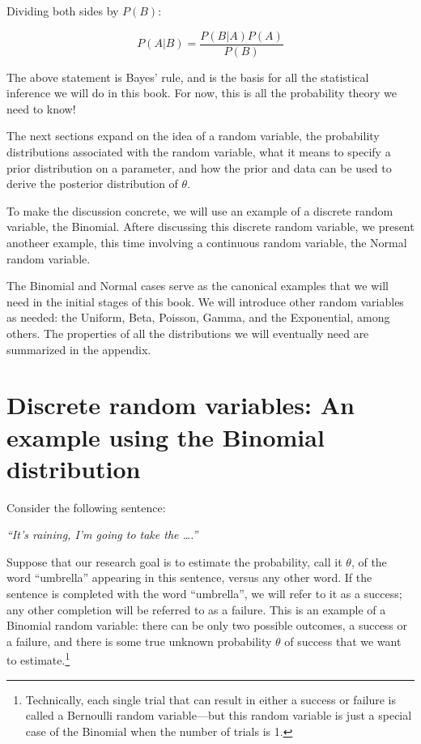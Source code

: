 \documentclass[12pt,]{krantz}
\begin{document}
Dividing both sides by \(P(B)\):

\begin{equation}
P(A|B)=\frac{P(B|A)P(A)}{P(B)}
\end{equation}

The above statement is Bayes' rule, and is the basis for all the statistical inference we will do in this book. For now, this is all the probability theory we need to know!

The next sections expand on the idea of a random variable, the probability distributions associated with the random variable, what it means to specify a prior distribution on a parameter, and how the prior and data can be used to derive the posterior distribution of \(\theta\).

To make the discussion concrete, we will use an example of a discrete random variable, the Binomial. Aftere discussing this discrete random variable, we present anotheer example, this time involving a continuous random variable, the Normal random variable.

The Binomial and Normal cases serve as the canonical examples that we will need in the initial stages of this book. We will introduce other random variables as needed: the Uniform, Beta, Poisson, Gamma, and the Exponential, among others. The properties of all the distributions we will eventually need are summarized in the appendix.

\hypertarget{discrete-random-variables-an-example-using-the-binomial-distribution}{%
\section{Discrete random variables: An example using the Binomial distribution}\label{discrete-random-variables-an-example-using-the-binomial-distribution}}

Consider the following sentence:

\emph{``It's raining, I'm going to take the \ldots{}.''}

Suppose that our research goal is to estimate the probability, call it \(\theta\), of the word ``umbrella'' appearing in this sentence, versus any other word. If the sentence is completed with the word ``umbrella'', we will refer to it as a success; any other completion will be referred to as a failure. This is an example of a Binomial random variable: there can be only two possible outcomes, a success or a failure, and there is some true unknown probability \(\theta\) of success that we want to estimate.\footnote{Technically, each single trial that can result in either a success or failure is called a Bernoulli random variable---but this random variable is just a special case of the Binomial when the number of trials is 1.}
\end{document}
